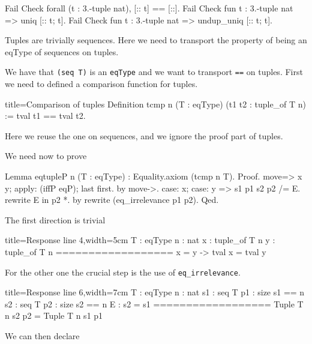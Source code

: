 \begin{coq}{}
Fail Check forall (t : 3.-tuple nat), [:: t] == [::].
Fail Check fun t : 3.-tuple nat => uniq [:: t; t].
Fail Check fun t : 3.-tuple nat => undup_uniq [:: t; t].
\end{coq}

Tuples are trivially sequences.  Here we need to transport the
property of being an eqType of sequences on tuples.


We have that \lstinline/(seq T)/ is an \lstinline/eqType/ and
we want to transport \lstinline/==/ on tuples.  First we need to
defined a comparison function for tuples.

\begin{coq}{title=Comparison of tuples}
Definition tcmp n (T : eqType) (t1 t2 : tuple_of T n) :=
  tval t1 == tval t2.
\end{coq}

Here we reuse the one on sequences, and we ignore the
proof part of tuples.

We need now to prove

\begin{coq}{}
Lemma eqtupleP n (T : eqType) : Equality.axiom (tcmp n T).
Proof.
move=> x y; apply: (iffP eqP); last first.
  by move->.
case: x; case: y => s1 p1 s2 p2 /= E.
rewrite E in p2 *.
by rewrite (eq_irrelevance p1 p2).
Qed.
\end{coq}

The first direction is trivial

\begin{coqout}{title=Response line 4,width=5cm}
T : eqType
n : nat
x : tuple_of T n
y : tuple_of T n
==================
x = y -> tval x = tval y
\end{coqout}

For the other one the crucial step is the use
of \lstinline/eq_irrelevance/.

\begin{coqout}{title=Response line 6,width=7cm}
T : eqType
n : nat
s1 : seq T
p1 : size s1 == n
s2 : seq T
p2 : size s2 == n
E : s2 = s1
==================
Tuple T n s2 p2 = Tuple T n s1 p1
\end{coqout}

We can then declare

